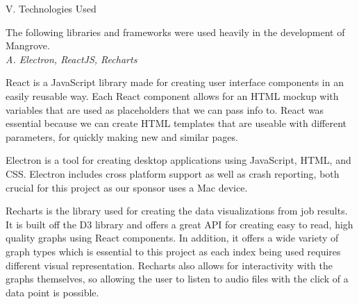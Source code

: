 \begin{center}
V. Technologies Used
\end{center}
\begin{flushleft}
  \setlength{\parindent}{0.125in}
The following libraries and frameworks were used heavily in the development of Mangrove.\\

\noindent\textit{A. Electron, ReactJS, Recharts}\par
React is a JavaScript library made for creating user interface components in an easily reusable way. Each React component allows for an HTML mockup with variables that are used as placeholders that we can pass info to. React was essential because we can create HTML templates that are useable with different parameters, for quickly making new and similar pages.\par
Electron is a tool for creating desktop applications using JavaScript, HTML, and CSS. Electron includes cross platform support as well as crash reporting, both crucial for this project as our sponsor uses a Mac device.\par
Recharts is the library used for creating the data visualizations from job results. It is built off the D3 library and offers a great API for creating easy to read, high quality graphs using React components. In addition, it offers a wide variety of graph types which is essential to this project as each index being used requires different visual representation. Recharts also allows for interactivity with the graphs themselves, so allowing the user to listen to audio files with the click of a data point is possible.\par


\end{flushleft}
